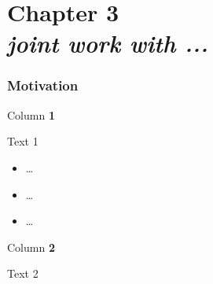 \section{Chapter 3\\ \textit{\textmd{joint work with ...}}}
\label{chapter3}

\begin{frame}[t]\frametitle{Motivation}
  \begin{minipage}[t]{0.45\textwidth}
    \vspace{0pt}

    \colorbox{shadecolor}{\parbox[c][1\baselineskip][t]{\textwidth}{Column \textbf{1}}}
    \vspace{1em}
    \raggedright \pause
    Text 1 \\
    \begin{itemize}
      \item \ldots
      \item \ldots
      \item \ldots
    \end{itemize}
    \vspace{0pt}
  \end{minipage}%
  \hfill
  \begin{minipage}[t]{0.5\textwidth}
    \vspace{0pt}
    \colorbox{shadecolor}{\parbox[c][1\baselineskip][t]{\textwidth}{Column \textbf{2}}}
    \vspace{1em}
    \raggedright \pause
    Text 2
  \end{minipage}
  \vfill \hyperlink{backup_3}{}
\end{frame}
